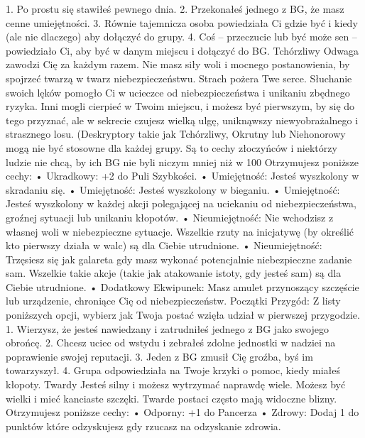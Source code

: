 1. Po prostu się stawiłeś pewnego dnia.
2. Przekonałeś jednego z BG, że masz cenne umiejętności.
3. Równie tajemnicza osoba powiedziała Ci gdzie być i kiedy (ale nie dlaczego) aby dołączyć do grupy.
4. Coś – przeczucie lub być może sen – powiedziało Ci, aby być w danym miejscu i dołączyć do BG.
Tchórzliwy
Odwaga zawodzi Cię za każdym razem. Nie masz siły woli i mocnego postanowienia, by spojrzeć twarzą w twarz niebezpieczeństwu. Strach pożera Twe serce. Słuchanie swoich lęków pomogło Ci w ucieczce od niebezpieczeństwa i unikaniu zbędnego ryzyka. Inni mogli cierpieć w Twoim miejscu, i możesz być pierwszym, by się do tego przyznać, ale w sekrecie czujesz wielką ulgę, uniknąwszy niewyobrażalnego i strasznego losu.
(Deskryptory takie jak Tchórzliwy, Okrutny lub Niehonorowy mogą nie być stosowne dla każdej grupy. Są to cechy złoczyńców i niektórzy ludzie nie chcą, by ich BG nie byli niczym mniej niż w 100%
Otrzymujesz poniższe cechy:
    • Ukradkowy: +2 do Puli Szybkości.
    • Umiejętność: Jesteś wyszkolony w skradaniu się.
    • Umiejętność: Jesteś wyszkolony w bieganiu.
    • Umiejętność: Jesteś wyszkolony w każdej akcji polegającej na uciekaniu od niebezpieczeństwa, groźnej sytuacji lub unikaniu kłopotów. 
    • Nieumiejętność: Nie wchodzisz z własnej woli w niebezpieczne sytuacje. Wszelkie rzuty na inicjatywę (by określić kto pierwszy działa w walc) są dla Ciebie utrudnione.
    • Nieumiejętność: Trzęsiesz się jak galareta gdy masz wykonać potencjalnie niebezpieczne zadanie sam. Wszelkie takie akcje (takie jak atakowanie istoty, gdy jesteś sam) są dla Ciebie utrudnione.
    • Dodatkowy Ekwipunek: Masz amulet przynoszący szczęście lub urządzenie, chroniące Cię od niebezpieczeństw. 
Początki Przygód: Z listy poniższych opcji, wybierz jak Twoja postać wzięła udział w pierwszej przygodzie.
1. Wierzysz, że jesteś nawiedzany i zatrudniłeś jednego z BG jako swojego obrońcę.
2. Chcesz uciec od wstydu i zebrałeś zdolne jednostki w nadziei na poprawienie swojej reputacji.
3. Jeden z BG zmusił Cię groźba, byś im towarzyszył.
4. Grupa odpowiedziała na Twoje krzyki o pomoc, kiedy miałeś kłopoty.
Twardy
Jesteś silny i możesz wytrzymać naprawdę wiele. Możesz być wielki i mieć kanciaste szczęki. Twarde postaci często mają widoczne blizny.
Otrzymujesz poniższe cechy:
    • Odporny: +1 do Pancerza
    • Zdrowy: Dodaj 1 do punktów które odzyskujesz gdy rzucasz na odzyskanie zdrowia.

